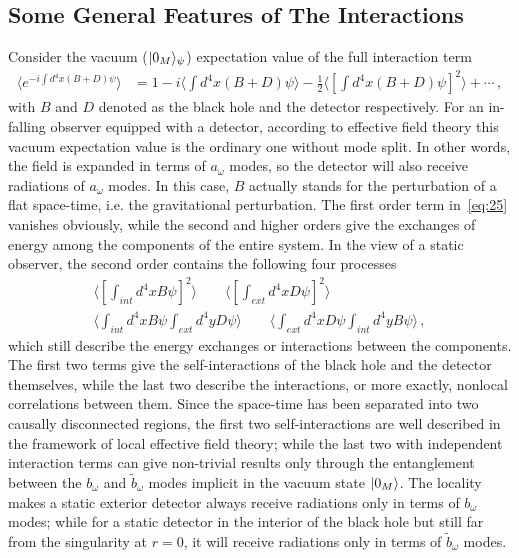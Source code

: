 \documentclass[12pt,a4paper]{article}
\begin{document}
\subsection{Some General Features of The Interactions }
\label{sec:feature}


Consider the vacuum ($\arrowvert0_M\rangle_{\psi}$) expectation
value of the full interaction term
\begin{equation}
\label{eq:25}
\begin{split}
\langle e^{-i\int d^4x(B+D)\psi}\rangle &= 1-i\langle\int
d^4x(B+D)\psi\rangle-\frac{1}{2}\langle[\int
d^4x(B+D)\psi]^2\rangle+\cdots \,,
\end{split}
\end{equation}
with $B$ and $D$ denoted as the black hole and the detector respectively. For an in-falling observer equipped with a detector, according to effective field theory this vacuum expectation value is the ordinary one without mode split. In other words, the field is expanded in terms of $a_{\omega}$ modes, so the detector will also receive radiations of $a_{\omega}$ modes. In this case, $B$ actually stands for the perturbation of a flat space-time, i.e. the gravitational perturbation. The first order term in~\eqref{eq:25} vanishes obviously, while the second and higher orders give the exchanges of energy among the components of the entire system. In the view of a static observer, the second order contains the following four processes
\begin{equation}
\label{eq:26}
\begin{split}
\langle[\int_{int} d^4xB\psi]^2\rangle \qquad\langle[\int_{ext}
d^4xD\psi]^2\rangle \\ \langle\int_{int} d^4xB\psi\int_{ext}
d^4yD\psi\rangle \qquad\langle\int_{ext} d^4xD\psi\int_{int} d^4yB\psi\rangle
\,,
\end{split}
\end{equation}
which still describe the energy exchanges or interactions between the components. The first two terms give the self-interactions of the black
hole and the detector themselves, while the last two describe the
interactions, or more exactly, nonlocal correlations between them. Since the space-time has been separated
into two causally disconnected regions, the first two self-interactions are well described in the framework of local effective field theory; while the last two with independent interaction terms can give non-trivial results only through the entanglement between the $b_{\omega}$ and $\tilde{b}_{\omega}$ modes implicit in the vacuum state $\arrowvert0_M\rangle$. The locality makes a static
exterior detector always receive radiations only in terms of $b_{\omega}$ modes; while for a static detector in the interior of the black hole but still far from the singularity at $r=0$, it will receive radiations only in terms of $\tilde{b}_{\omega}$ modes.
\end{document}
